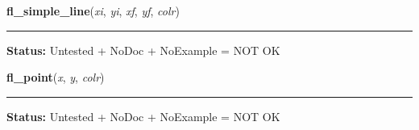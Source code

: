     \label{xformslib:library:fl_line}

    \vspace{0.5ex}

\hspace{.8\funcindent}\begin{boxedminipage}{\funcwidth}

    \raggedright \textbf{fl\_simple\_line}(\textit{xi}, \textit{yi}, \textit{xf}, \textit{yf}, \textit{colr})

    \vspace{-1.5ex}

    \rule{\textwidth}{0.5\fboxrule}
\setlength{\parskip}{2ex}
\setlength{\parskip}{1ex}
\textbf{Status:} Untested + NoDoc + NoExample = NOT OK



    \end{boxedminipage}

    \label{xformslib:library:fl_point}

    \vspace{0.5ex}

\hspace{.8\funcindent}\begin{boxedminipage}{\funcwidth}

    \raggedright \textbf{fl\_point}(\textit{x}, \textit{y}, \textit{colr})

    \vspace{-1.5ex}

    \rule{\textwidth}{0.5\fboxrule}
\setlength{\parskip}{2ex}
\setlength{\parskip}{1ex}
\textbf{Status:} Untested + NoDoc + NoExample = NOT OK



    \end{boxedminipage}

    \label{xformslib:library:fl_points}

    \vspace{0.5ex}

